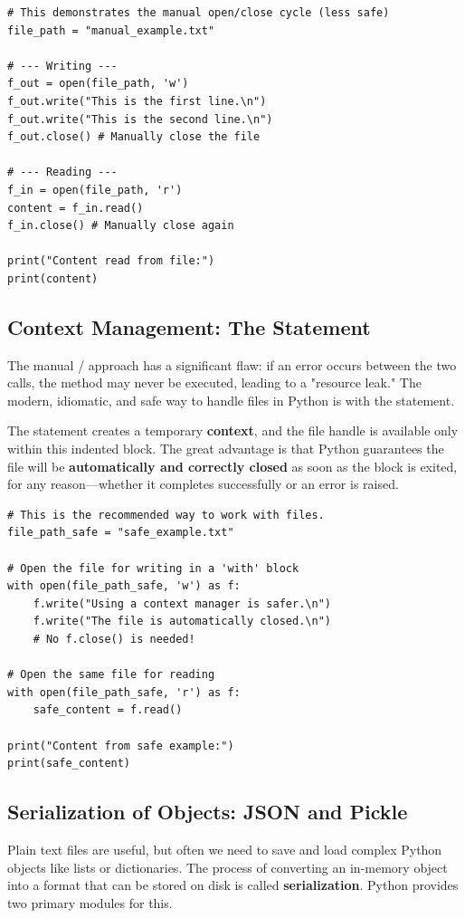 \text{ }\begin{verbatim}
# This demonstrates the manual open/close cycle (less safe)
file_path = "manual_example.txt"

# --- Writing ---
f_out = open(file_path, 'w')
f_out.write("This is the first line.\n")
f_out.write("This is the second line.\n")
f_out.close() # Manually close the file

# --- Reading ---
f_in = open(file_path, 'r')
content = f_in.read()
f_in.close() # Manually close again

print("Content read from file:")
print(content)
\end{verbatim}

\subsection{Context Management: The  Statement}
\label{subsec:with_open}
The manual / approach has a significant flaw: if an error occurs between the two calls, the  method may never be executed, leading to a "resource leak." The modern, idiomatic, and safe way to handle files in Python is with the  statement.

The  statement creates a temporary \textbf{context}, and the file handle is available only within this indented block. The great advantage is that Python guarantees the file will be \textbf{automatically and correctly closed} as soon as the block is exited, for any reason—whether it completes successfully or an error is raised.

\begin{example}
\text{ }\begin{verbatim}
# This is the recommended way to work with files.
file_path_safe = "safe_example.txt"

# Open the file for writing in a 'with' block
with open(file_path_safe, 'w') as f:
    f.write("Using a context manager is safer.\n")
    f.write("The file is automatically closed.\n")
    # No f.close() is needed!

# Open the same file for reading
with open(file_path_safe, 'r') as f:
    safe_content = f.read()

print("Content from safe example:")
print(safe_content)
\end{verbatim}
\end{example}

\subsection{Serialization of Objects: JSON and Pickle}
\label{subsec:serialization}
Plain text files are useful, but often we need to save and load complex Python objects like lists or dictionaries. The process of converting an in-memory object into a format that can be stored on disk is called \textbf{serialization}. Python provides two primary modules for this.

